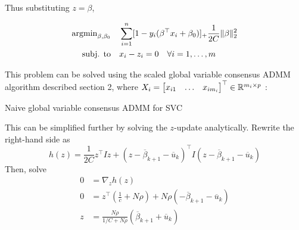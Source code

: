 \documentclass[11pt]{article}
\begin{document}
Thus substituting $z = \beta$, 

\begin{equation} 
\begin{aligned}
\operatorname{argmin}_{\beta, \beta_0} \quad 
&  \sum_{i=1}^n [1 - y_i (\beta^\top x_i + \beta_0)]_+ \frac{1}{2C} \|\beta\|_2^2 \\
\textrm{subj. to} \quad & x_i - z_i = 0 \quad \forall i = 1, \ldots, m
\end{aligned}
\end{equation}

This problem can be solved using the scaled global variable consensus ADMM algorithm described section 2,
where $X_i = \begin{bmatrix} x_{i1} & \ldots & x_{im_i} \end{bmatrix}^\top \in \mathbb{R}^{m_i \times p}$ : \\

\begin{algorithm}[H]
    \caption{Naive global variable consensus ADMM for SVC}

    \SetAlgoNoLine

\end{algorithm}

This can be simplified further by solving the $z$-update analytically. Rewrite the right-hand 
side as 
\[
    h(z) = \frac{1}{2C} z^\top I z + (z - \overline{\beta}_{k+1} - \overline{u}_k)^\top I (z - \overline{\beta}_{k+1} - \overline{u}_k)
\]
Then, solve 
\begin{align*}
    0 &= \nabla_z h(z)  \\
    0 &= z^\top \left(\frac{1}{c} + N\rho \right) + N\rho \left(- \overline{\beta}_{k+1} - \overline{u}_k \right) \\
    z &= \frac{N \rho}{1/C + N\rho} \left( \overline{\beta}_{k+1} + \overline{u}_k \right)
\end{align*}
\end{document}
